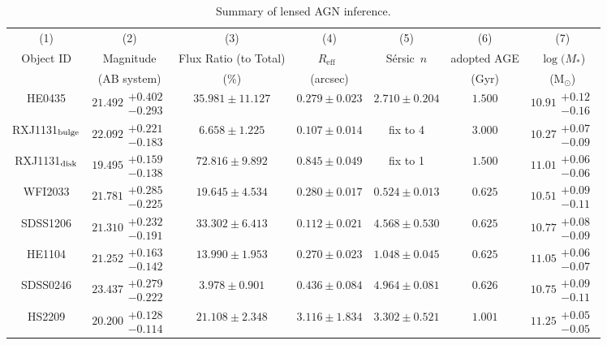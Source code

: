 \documentclass[fleqn,usenatbib]{mnras}
\newcommand{\sersic}{S\'ersic}
\newcommand{\reff}{{$R_{\mathrm{eff}}$}}
\begin{document}
\begin{table}
\renewcommand{\arraystretch}{1.25}
\centering
  \begin{threeparttable}
\caption{Summary of lensed AGN inference.}\label{tab:host_measure}    
     \begin{tabular}{ccccccc}
\hline     
(1) & (2) & (3) & (4) & (5) & (6) & (7) \\    
Object ID & Magnitude & Flux Ratio (to Total) & \reff\ & \sersic\ $n$ & adopted AGE & $\log (M_{*}$)  \\
 & (AB system) & ($\%$) & (arcsec) & & (Gyr) & (M$_{\odot}$) \\ \hline
HE0435 & $21.492\substack{+0.402\\-0.293}$ & $35.981\pm11.127$ & $0.279\pm0.023$ & $2.710\pm0.204$ & $1.500$ & $10.91\substack{+0.12\\-0.16}$ \\
RXJ1131$_{\rm bulge}$ & $22.092\substack{+0.221\\-0.183}$ & $6.658\pm1.225$ & $0.107\pm0.014$ & fix to 4 & $3.000$ & $10.27\substack{+0.07\\-0.09}$ \\
RXJ1131$_{\rm disk}$ & $19.495\substack{+0.159\\-0.138}$ & $72.816\pm9.892$ & $0.845\pm0.049$ & fix to 1 & $1.500$ & $11.01\substack{+0.06\\-0.06}$ \\
WFI2033 & $21.781\substack{+0.285\\-0.225}$ & $19.645\pm4.534$ & $0.280\pm0.017$ & $0.524\pm0.013$ & $0.625$ & $10.51\substack{+0.09\\-0.11}$ \\
SDSS1206 & $21.310\substack{+0.232\\-0.191}$ & $33.302\pm6.413$ & $0.112\pm0.021$ & $4.568\pm0.530$ & $0.625$ & $10.77\substack{+0.08\\-0.09}$ \\
HE1104 & $21.252\substack{+0.163\\-0.142}$ & $13.990\pm1.953$ & $0.270\pm0.023$ & $1.048\pm0.045$ & $0.625$ & $11.05\substack{+0.06\\-0.07}$ \\
SDSS0246 & $23.437\substack{+0.279\\-0.222}$ & $3.978\pm0.901$ & $0.436\pm0.084$ & $4.964\pm0.081$ & $0.626$ & $10.75\substack{+0.09\\-0.11}$ \\
HS2209 & $20.200\substack{+0.128\\-0.114}$ & $21.108\pm2.348$ & $3.116\pm1.834$ & $3.302\pm0.521$ & $1.001$ & $11.25\substack{+0.05\\-0.05}$ \\

\end{tabular}
\end{threeparttable}
\end{table}
\end{document}
